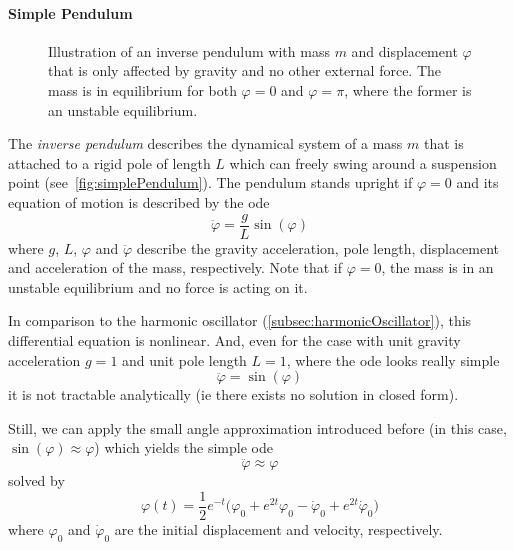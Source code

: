 	\paragraph{Simple Pendulum}
		\label{subsec:simplePendulum}

		\begin{figure}
			\centering
			\tikzSimplePendulum
			\caption{Illustration of an inverse pendulum with mass \(m\) and displacement \(\varphi\) that is only affected by gravity and no other external force. The mass is in equilibrium for both \( \varphi = 0 \) and \( \varphi = \pi \), where the former is an unstable equilibrium.}
			\label{fig:simplePendulum}
		\end{figure}

		The \emph{inverse pendulum} describes the dynamical system of a mass \(m\) that is attached to a rigid pole of length \(L\) which can freely swing around a suspension point (see~\autoref{fig:simplePendulum}). The pendulum stands upright if \( \varphi = 0 \) and its equation of motion is described by the \ac{ode}
		\begin{equation*}
			\ddot{\varphi} = \frac{g}{L} \sin(\varphi)
		\end{equation*}
		where \(g\), \(L\), \(\varphi\) and \(\ddot{\varphi}\) describe the gravity acceleration, pole length, displacement and acceleration of the mass, respectively. Note that if \( \varphi = 0 \), the mass is in an unstable equilibrium and no force is acting on it.

		In comparison to the harmonic oscillator (\autoref{subsec:harmonicOscillator}), this differential equation is nonlinear. And, even for the case with unit gravity acceleration \( g = 1 \) and unit pole length \( L = 1\), where the \ac{ode} looks really simple
		\begin{equation}
			\ddot{\varphi} = \sin(\varphi)  \label{eq:inversePendulum}
		\end{equation}
		it is not tractable analytically (\ac{ie} there exists no solution in closed form).

		Still, we can apply the small angle approximation introduced before (in this case, \( \sin(\varphi) \approx \varphi \)) which yields the simple \ac{ode}
		\begin{equation}
			\ddot{\varphi} \approx \varphi  \label{eq:linearizedInversePendulum}
		\end{equation}
		solved by
		\begin{equation*}
			\varphi(t) = \frac{1}{2} e^{-t} \big(\varphi_0 + e^{2t} \varphi_0 - \dot{\varphi}_0 + e^{2t} \dot{\varphi}_0\big)
		\end{equation*}
		where \(\varphi_0\) and \(\dot{\varphi}_0\) are the initial displacement and velocity, respectively.

